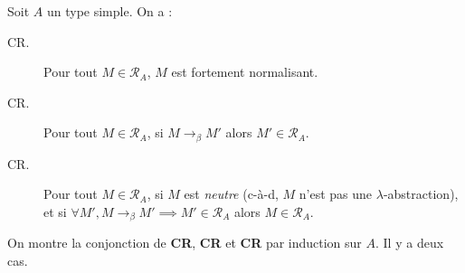\documentclass[./main]{subfiles}
\begin{document}
  \begin{prop}
    Soit $A$ un type simple.
    On a :
    \begin{description}
      \item[CR.] Pour tout $M \in \mathcal{R}_A$, $M$ est fortement normalisant.
      \item[CR.] Pour tout $M \in \mathcal{R}_A$, si $M \to_\beta M'$ alors $M' \in \mathcal{R}_A$.
      \item[CR.] Pour tout $M \in \mathcal{R}_A$, si $M$ est \textit{neutre} (c-à-d, $M$ n'est pas une $\lambda$-abstraction), et si $\forall M', M \to_\beta M' \implies M' \in \mathcal{R}_A$ alors $M \in \mathcal{R}_A$.
    \end{description}
  \end{prop}
  \begin{prv}
    On montre la conjonction de \textbf{\textsf{CR}}, \textbf{\textsf{CR}} et \textbf{\textsf{CR}} par induction sur $A$.
    Il y a deux cas.


\end{prv}
\end{document}
